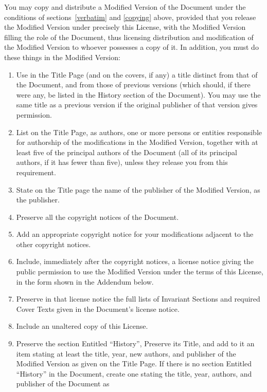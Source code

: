 \documentclass[10pt,a4paper,titlepage,twoside,openright]{report}
\begin{document}
You may copy and distribute a Modified Version of the Document under
the conditions of sections~\ref{verbatim} and \ref{copying} above,
provided that you release
the Modified Version under precisely this License, with the Modified
Version filling the role of the Document, thus licensing distribution
and modification of the Modified Version to whoever possesses a copy
of it.  In addition, you must do these things in the Modified Version:

\begin{enumerate}
\item Use in the Title Page (and on the covers, if any) a title distinct
   from that of the Document, and from those of previous versions
   (which should, if there were any, be listed in the History section
   of the Document).  You may use the same title as a previous version
   if the original publisher of that version gives permission.
\item List on the Title Page, as authors, one or more persons or entities
   responsible for authorship of the modifications in the Modified
   Version, together with at least five of the principal authors of the
   Document (all of its principal authors, if it has fewer than five),
   unless they release you from this requirement.
\item State on the Title page the name of the publisher of the
   Modified Version, as the publisher.
\item Preserve all the copyright notices of the Document.
\item Add an appropriate copyright notice for your modifications
   adjacent to the other copyright notices.
\item Include, immediately after the copyright notices, a license notice
   giving the public permission to use the Modified Version under the
   terms of this License, in the form shown in the Addendum below.
\item Preserve in that license notice the full lists of Invariant Sections
   and required Cover Texts given in the Document's license notice.
\item Include an unaltered copy of this License.
\item Preserve the section Entitled ``History'', Preserve its Title, and add
   to it an item stating at least the title, year, new authors, and
   publisher of the Modified Version as given on the Title Page.  If
   there is no section Entitled ``History'' in the Document, create one
   stating the title, year, authors, and publisher of the Document as

\end{enumerate}
\end{document}
